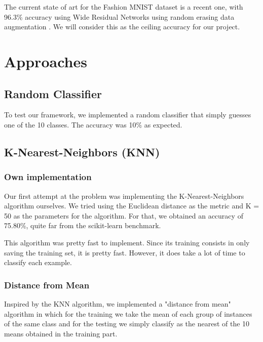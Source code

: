 \documentclass[twoside,twocolumn]{article}
\begin{document}
The current state of art for the Fashion MNIST dataset is a recent one, with 96.3\% accuracy using Wide
Residual Networks using random erasing data augmentation \cite{randomerasingdataaugmentationpaper}.
We will consider this as the ceiling accuracy for our project.


\section{Approaches}

\subsection{Random Classifier}

To test our framework, we implemented a random classifier that simply guesses one of the 10 classes. The accuracy was 10\% as expected.

\subsection{K-Nearest-Neighbors (KNN)}

\subsubsection{Own implementation}

Our first attempt at the problem was implementing the K-Nearest-Neighbors algorithm ourselves.
We tried using the Euclidean distance as the metric and K = 50 as the parameters for the algorithm.
For that, we obtained an accuracy of 75.80\%, quite far from the scikit-learn benchmark.

This algorithm was pretty fast to implement.
Since its training consists in only saving the training set, it is pretty fast.
However, it does take a lot of time to classify each example.

\subsubsection{Distance from Mean}

Inspired by the KNN algorithm, we implemented a "distance from mean" algorithm in which for the training we
take the mean of each group of instances of the same class and for the testing we simply classify as the nearest
of the 10 means obtained in the training part.
\end{document}
